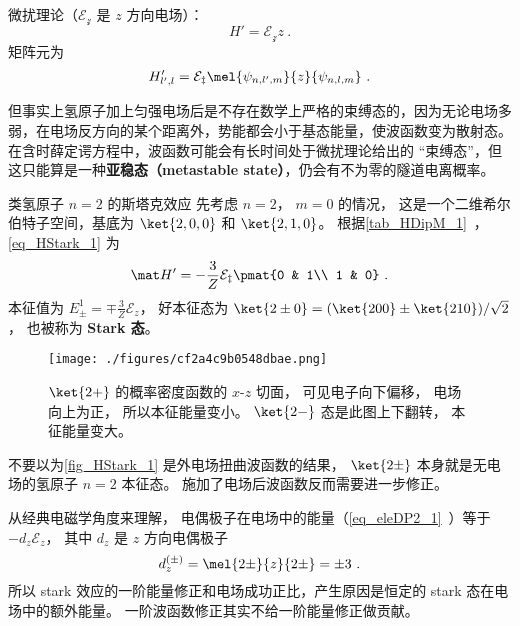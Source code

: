 
\begin{issues}
\issueTODO
\end{issues}


微扰理论（$\mathcal{E_z}$ 是 $z$ 方向电场）：
\begin{equation}
H' = \mathcal{E_z} z~.
\end{equation}
矩阵元为
\begin{equation}\label{eq_HStark_1}
H'_{l',l} = \mathcal{E_z}\mel{\psi_{n,l',m}}{z}{\psi_{n,l,m}}~.
\end{equation}

但事实上氢原子加上匀强电场后是不存在数学上严格的束缚态的，因为无论电场多弱，在电场反方向的某个距离外，势能都会小于基态能量，使波函数变为散射态。在含时薛定谔方程中，波函数可能会有长时间处于微扰理论给出的 “束缚态”，但这只能算是一种\textbf{亚稳态（metastable state）}，仍会有不为零的隧道电离概率。

\begin{example}{类氢原子 $n=2$ 的斯塔克效应}
先考虑 $n=2$， $m=0$ 的情况， 这是一个二维希尔伯特子空间，基底为 $\ket{2,0,0}$ 和 $\ket{2,1,0}$。 根据\autoref{tab_HDipM_1}~， \autoref{eq_HStark_1} 为
\begin{equation}
\mat H' = -\frac{3}{Z}\mathcal{E_z}\pmat{0 & 1\\ 1 & 0}~.
\end{equation}
本征值为 $E_{\pm}^1 = \mp \frac{3}{Z}\mathcal{E}_z$， 好本征态为 $\ket{2\pm 0} = (\ket{200} \pm \ket{210})/{\sqrt 2}$， 也被称为 \textbf{Stark 态}。

\begin{figure}[ht]
\centering
\texttt{[image: ./figures/cf2a4c9b0548dbae.png]}
\caption{$\ket{2+}$ 的概率密度函数的 $x$-$z$ 切面， 可见电子向下偏移， 电场向上为正， 所以本征能量变小。 $\ket{2-}$ 态是此图上下翻转， 本征能量变大。} \label{fig_HStark_1}
\end{figure}

不要以为\autoref{fig_HStark_1} 是外电场扭曲波函数的结果， $\ket{2\pm}$ 本身就是无电场的氢原子 $n=2$ 本征态。 施加了电场后波函数反而需要进一步修正。

从经典电磁学角度来理解， 电偶极子在电场中的能量（\autoref{eq_eleDP2_1}~）等于 $-d_z \mathcal{E}_z$， 其中 $d_z$ 是 $z$ 方向电偶极子
\begin{equation}
d_z^{(\pm)} = \mel{2\pm}{z}{2\pm} = \pm 3~.
\end{equation}
所以 stark 效应的一阶能量修正和电场成功正比，产生原因是恒定的 stark 态在电场中的额外能量。 一阶波函数修正其实不给一阶能量修正做贡献。
\end{example}

